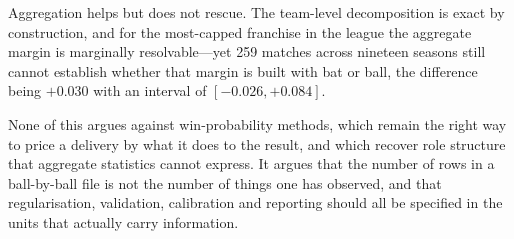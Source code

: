 \documentclass[conference]{IEEEtran}
\begin{document}
Aggregation helps but does not rescue. The team-level decomposition is
exact by construction, and for the most-capped franchise in the league
the aggregate margin is marginally resolvable---yet 259 matches across
nineteen seasons still cannot establish whether that margin is built
with bat or ball, the difference being $+0.030$ with an interval of
$[-0.026, +0.084]$.

None of this argues against win-probability methods, which remain the
right way to price a delivery by what it does to the result, and which
recover role structure that aggregate statistics cannot express. It
argues that the number of rows in a ball-by-ball file is not the number
of things one has observed, and that regularisation, validation,
calibration and reporting should all be specified in the units that
actually carry information.
\end{document}
